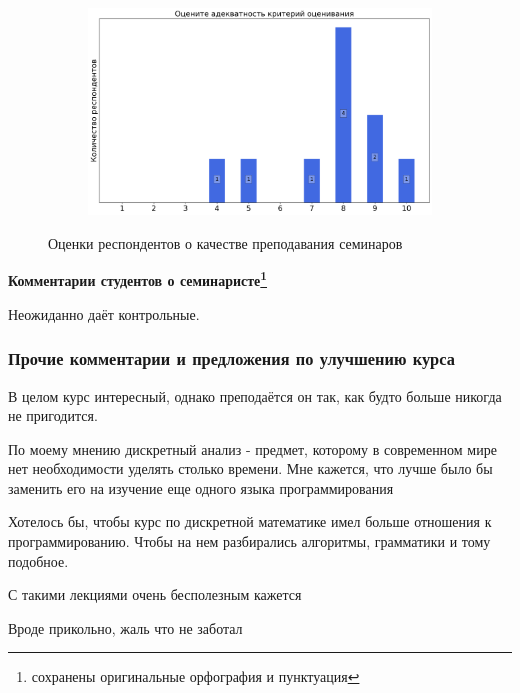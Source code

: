 \begin{figure}[H]
\begin{subfigure}[b]{0.45\textwidth}
			\end{subfigure}
			\begin{subfigure}[b]{0.45\textwidth}
				\centering
				\includegraphics[width=\textwidth]{images/1 course/Дискретный анализ/seminarists-marks-Теймуразов К.Б.-3.png}
			\end{subfigure}	
			\caption{Оценки респондентов о качестве преподавания семинаров}
		\end{figure}

		\textbf{Комментарии студентов о семинаристе\protect\footnote{сохранены оригинальные орфография и пунктуация}}
            \begin{commentbox} 
                Неожиданно даёт контрольные. 
            \end{commentbox} 

    
    \subsubsection{Прочие комментарии и предложения по улучшению курса}
        \begin{commentbox}
            В целом курс интересный, однако преподаётся он так, как будто больше никогда не пригодится. 
        \end{commentbox}

        \begin{commentbox}
            По моему мнению дискретный анализ - предмет, которому в современном мире нет необходимости уделять столько времени. Мне кажется, что лучше было бы заменить его на изучение еще одного языка программирования
        \end{commentbox}

        \begin{commentbox}
            Хотелось бы, чтобы курс по дискретной математике имел больше отношения к программированию. Чтобы на нем разбирались алгоритмы, грамматики и тому подобное.
        \end{commentbox}

        \begin{commentbox}
            С такими лекциями очень бесполезным кажется
        \end{commentbox}

        \begin{commentbox}
            Вроде прикольно, жаль что не заботал
        \end{commentbox}